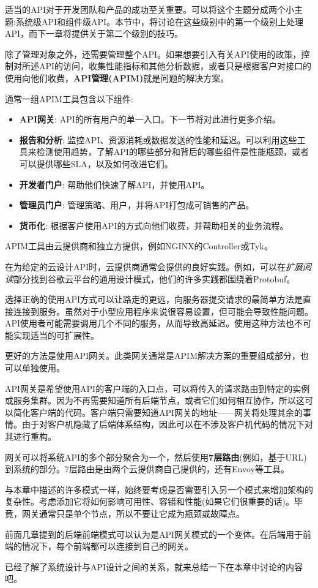 
适当的API对于开发团队和产品的成功至关重要。可以将这个主题分成两个小主题:系统级API和组件级API。本节中，将讨论在这些级别中的第一个级别上处理API，而下一章将提供关于第二个级别的技巧。

除了管理对象之外，还需要管理整个API。如果想要引入有关API使用的政策，控制对所述API的访问，收集性能指标和其他分析数据，或者只是根据客户对接口的使用向他们收费，\textbf{API管理(APIM)}就是问题的解决方案。

通常一组APIM工具包含以下组件:

\begin{itemize}
\item 
\textbf{API网关}: API的所有用户的单一入口。下一节将对此进行更多介绍。

\item 
\textbf{报告和分析}: 监控API、资源消耗或数据发送的性能和延迟。可以利用这些工具来检测使用趋势，了解API的哪些部分和背后的哪些组件是性能瓶颈，或者可以提供哪些SLA，以及如何改进它们。

\item 
\textbf{开发者门户}: 帮助他们快速了解API，并使用API。

\item 
\textbf{管理员门户}: 管理策略、用户，并将API打包成可销售的产品。

\item  
\textbf{货币化}: 根据客户使用API的方式向他们收费，并帮助相关的业务流程。
\end{itemize}

APIM工具由云提供商和独立方提供，例如NGINX的Controller或Tyk。

在为给定的云设计API时，云提供商通常会提供的良好实践。例如，可以在\textit{扩展阅读}部分找到谷歌云平台的通用设计模式，他们的许多实践都围绕着Protobuf。

选择正确的使用API方式可以让路走的更远，向服务器提交请求的最简单方法是直接连接到服务。虽然对于小型应用程序来说很容易设置，但可能会导致性能问题。API使用者可能需要调用几个不同的服务，从而导致高延迟。使用这种方法也不可能实现适当的可扩展性。

更好的方法是使用API网关。此类网关通常是APIM解决方案的重要组成部分，也可以单独使用。


API网关是希望使用API的客户端的入口点，可以将传入的请求路由到特定的实例或服务集群。因为不再需要知道所有后端节点，或者它们如何相互协作，所以这可以简化客户端的代码。客户端只需要知道API网关的地址——网关将处理其余的事情。由于对客户机隐藏了后端体系结构，因此可以在不涉及客户机代码的情况下对其进行重构。

网关可以将系统API的多个部分聚合为一个，然后使用\textbf{7层路由}(例如，基于URL)到系统的部分。7层路由是由两个云提供商自己提供的，还有Envoy等工具。

与本章中描述的许多模式一样，始终要考虑是否需要引入另一个模式来增加架构的复杂性。考虑添加它将如何影响可用性、容错和性能(如果它们很重要的话)。毕竟，网关通常只是单个节点，所以不要让它成为瓶颈或故障点。

前面几章提到的后端前端模式可以认为是API网关模式的一个变体。在后端用于前端的情况下，每个前端都可以连接到自己的网关。

已经了解了系统设计与API设计之间的关系，就来总结一下在本章中讨论的内容吧。











